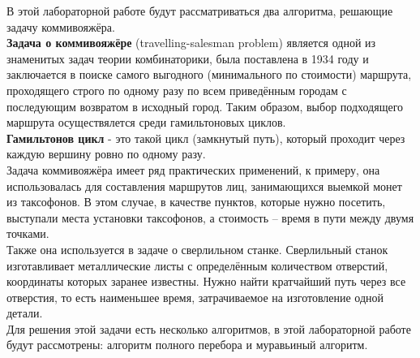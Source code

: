 В этой лабораторной работе будут рассматриваться два алгоритма, решающие задачу коммивояжёра. \\

\textbf{Задача о коммивояжёре} (travelling-salesman problem) является одной из знаменитых задач теории комбинаторики, была поставлена в 1934 году и заключается в поиске самого выгодного (минимального по стоимости) маршрута, проходящего строго по одному разу по всем приведённым городам с последующим возвратом в исходный город. Таким образом, выбор подходящего маршрута осуществялется среди гамильтоновых циклов.\\

\textbf{Гамильтонов цикл}  - это такой цикл (замкнутый путь), который проходит через каждую вершину ровно по одному разу.\\

Задача коммивояжёра имеет ряд практических применений, к примеру, она использовалась для составления маршрутов лиц, занимающихся выемкой монет из таксофонов. В этом случае, в качестве пунктов, которые нужно посетить, выступали места установки таксофонов, а стоимость -- время в пути между двумя точками. \\

Также она используется в задаче о сверлильном станке. Сверлильный станок изготавливает металлические листы с определённым количеством отверстий, координаты которых заранее известны. Нужно найти кратчайший путь через все отверстия, то есть наименьшее время, затрачиваемое на изготовление одной детали. \\

Для решения этой задачи есть несколько алгоритмов, в этой лабораторной работе будут рассмотрены: алгоритм полного перебора и муравьиный алгоритм.
